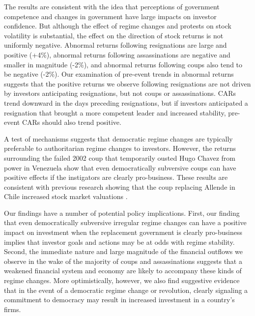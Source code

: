 \documentclass[12pt,final,fleqn]{article}
\theoremstyle{plain}
\begin{document}
The results are consistent with the idea that perceptions of government competence and changes in government have large impacts on investor confidence. But although the effect of regime changes and protests on stock volatility is substantial, the effect on the direction of stock returns is not uniformly negative. Abnormal returns following resignations are large and positive (+4\%), abnormal returns following assassinations are negative and smaller in magnitude (-2\%), and abnormal returns following coups also tend to be negative (-2\%). Our examination of pre-event trends in abnormal returns suggests that the positive returns we observe following resignations are not driven by investors anticipating resignations, but not coups or assassinations. CARs trend downward in the days preceding resignations, but if investors anticipated a resignation that brought a more competent leader and increased stability, pre-event CARs should also trend positive. 

A test of mechanisms suggests that democratic regime changes are typically preferable to authoritarian regime changes to investors. However, the returns surrounding the failed 2002 coup that temporarily ousted Hugo Chavez from power in Venezuela show that even democratically subversive coups can have positive effects if the instigators are clearly pro-business. These results are consistent with previous research showing that the coup replacing Allende in Chile increased stock market valuations \citep{girardi2018institution}. 

Our findings have a number of potential policy implications. First, our finding that even democratically subversive irregular regime changes can have a positive impact on investment when the replacement government is clearly pro-business  implies that investor goals and actions may be at odds with regime stability. Second, the immediate nature and large magnitude of the financial outflows we observe in the wake of the majority of coups and assassinations suggests that a weakened financial system and economy are likely to accompany these kinds of regime changes. More optimistically, however, we also find suggestive evidence that in the event of a democratic regime change or revolution, clearly signaling a commitment to democracy may result in increased investment in a country's firms.
\end{document}
